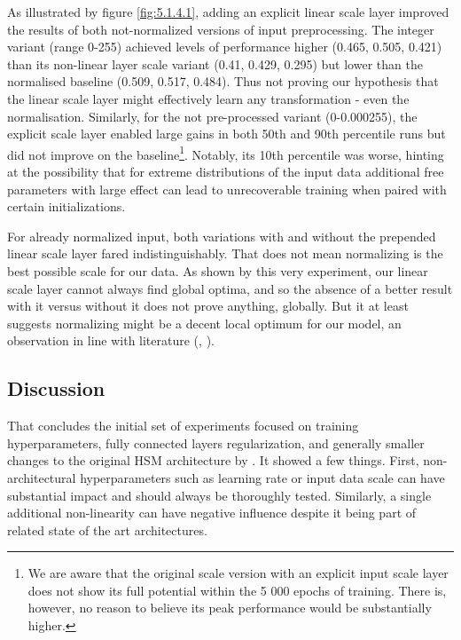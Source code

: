 As illustrated by figure \ref{fig:5.1.4.1}, adding an explicit linear scale layer improved the results of both not-normalized versions of input preprocessing. The integer variant (range 0-255) achieved levels of performance higher (0.465, 0.505, 0.421) than its non-linear layer scale variant (0.41, 0.429, 0.295) but lower than the normalised baseline (0.509, 0.517, 0.484). Thus not proving our hypothesis that the linear scale layer might effectively learn any transformation - even the normalisation. Similarly, for the not pre-processed variant (0-0.000255), the explicit scale layer enabled large gains in both 50th and 90th percentile runs but did not improve on the baseline\footnote{We are aware that the original scale version with an explicit input scale layer does not show its full potential within the 5 000 epochs of training. There is, however, no reason to believe its peak performance would be substantially higher.}. Notably, its 10th percentile was worse, hinting at the possibility that for extreme distributions of the input data additional free parameters with large effect can lead to unrecoverable training when paired with certain initializations.

For already normalized input, both variations with and without the prepended linear scale layer fared indistinguishably. That does not mean normalizing is the best possible scale for our data. As shown by this very experiment, our linear scale layer cannot always find global optima, and so the absence of a better result with it versus without it does not prove anything, globally. But it at least suggests normalizing might be a decent local optimum for our model, an observation in line with literature (\cite{Goodfellow-et-al-2016}, \cite{Jin2015}).


\subsection{Discussion}
That concludes the initial set of experiments focused on training hyperparameters, fully connected layers regularization, and generally smaller changes to the original HSM architecture by \citeauthor{antolik}. It showed a few things. First, non-architectural hyperparameters such as learning rate or input data scale can have substantial impact and should always be thoroughly tested. Similarly, a single additional non-linearity can have negative influence despite it being part of related state of the art architectures. 


